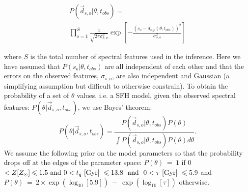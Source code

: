 \documentclass[useAMS,usenatbib]{mn2e}
\begin{document}

\begin{multline}\label{like}
P(\vec{d}_{s, o}|\theta, t_{obs}) = \\ \prod_{s=1}^{S} \frac{1}{\sqrt{2\pi\sigma_{s,o}^2}} \exp{\left[ - \frac{(s_{o} - d_{s, p}(\theta, t_{obs}))^2}{\sigma_{s, o}^2} \right]}
\end{multline}

where $S$ is the total number of spectral features used in the inference. Here we have assumed that $P(s_{o}|\theta, t_{obs})$ are all independent of each other and that the errors on the observed features, $\sigma_{s, o}$, are also independent and Gaussian (a simplifying assumption but difficult to otherwise constrain). To obtain the probability of a set of $\theta$ values, i.e. a SFH model, given the observed spectral features: $P(\theta|\vec{d}_{s,o}, t_{obs})$, we use Bayes' theorem:
 \begin{equation}\label{big}
P(\theta|\vec{d}_{s,o}, t_{obs}) = \frac{P(\vec{d}_{s,o}|\theta, t_{obs})P(\theta)}{\int P(\vec{d}_{s,o} |\theta, t_{obs})P(\theta) d\theta}.
\end{equation}
We assume the following prior on the model parameters so that the probability drops off at the edges of the parameter space: ${P(\theta)~=~1}$ if 0 $< Z [Z_{\odot}] \leq 1.5 \text{ and } 0 < t_q ~\rm{[Gyr]}~ \leq 13.8 ~ \text{ and } ~ 0 < \tau  ~\rm{[Gyr]}~ \leq 5.9$ and ${P(\theta)~=~2\times\exp\left(\log_{10}[5.9]\right)~-~\exp\left(\log_{10}[\tau]\right)}$ otherwise.


\end{document}
